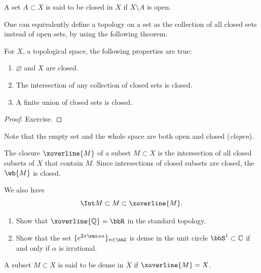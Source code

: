 \begin{defn}
    A set $A\subset X$ is said to be closed in $X$ if $X\setminus A$ is open.
\end{defn}

One can equivalently define a topology on a set as the collection of all closed sets instead of open sets, by using the following theorem.

\begin{thm}
    For $X$, a topological space, the following properties are true:
\begin{enumerate}
    \item $\varnothing$ and $X$ are closed.
    \item The intersection of any collection of closed sets is closed.
    \item A finite union of closed sets is closed.
\end{enumerate}
\end{thm}
\begin{proof}
    Exercise.
\end{proof}

Note that the empty set and the whole space are both open and closed (\emph{clopen}).

\begin{defn}
    The closure $\xoverline{M}$ of a subset $M\subset X$ is the intersection of all closed subsets of $X$ that contain $M$. Since intersections of closed subsets are closed, the $\wb{M}$ is closed.
\end{defn}

We also have
\begin{equation}
    \Int M \subset M \subset \xoverline{M}.
\end{equation}

\begin{xca}
\begin{enumerate}
    \item Show that $\xoverline{\mathbb{Q}}=\bbR $ in the standard topology.
    \item Show that the set $\{e^{2\pi\rmi \alpha n}\}_{n\in\bbZ}$ is dense in the unit circle $\bbS^1\subset \mathbb{C}$ if and only if $\alpha$ is irrational.
\end{enumerate}
\end{xca}

\begin{defn}
    A subset $M\subset X$ is said to be dense in $X$ if $\xoverline{M} = X$.
\end{defn}

